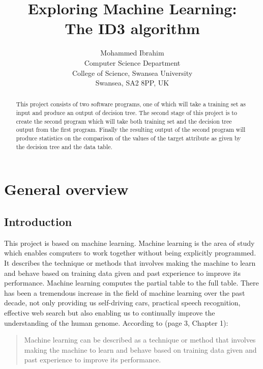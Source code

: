 \documentclass{report}
\begin{document}
\title{Exploring Machine Learning:\\
  The ID3 algorithm}

\author{Mohammed Ibrahim\\
 Computer Science Department\\
  College of Science, Swansea University\\
  Swansea, SA2 8PP, UK
}

\maketitle
\begin{abstract}
  
 This project consists of two software programs, one of which will take a training set as input and produce an output of decision tree. The second stage of this project is to create the second program which will take both training set and the decision tree output from the first program. Finally the resulting output of the second program will produce statistics on the comparison of the values of the target attribute as given by the decision tree and the data table.
  
  
\end{abstract}

\tableofcontents


\chapter{General overview}
\label{cha:genoverview}


\section{Introduction}
\label{sec:int}

This project is based on machine learning. Machine learning is the area of study which enables computers to work together without being explicitly programmed. It describes the technique or methods that involves making the machine to learn and behave based on training data given and past experience to improve its performance. Machine learning computes the partial table to the full table.
There has been a tremendous increase in the field of machine learning over the past decade, not only providing us self-driving cars, practical speech recognition,  effective web search but also enabling us to continually improve the understanding of the human genome. According to \cite{Alpaydin2010MachineLearning}(page 3, Chapter 1):
\begin{quote}
  Machine learning can be described as a technique or method that involves making the machine to learn and behave based on training data given and past experience to improve its performance.
\end{quote}
\end{document}
